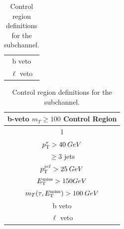 \begin{table}[!thp]
\begin{subtable}[c]{.45\textwidth}
\begin{tabular}{| c |}
					b veto \\
					$\ell$ veto \\
					\hline
				\end{tabular}
			\end{subtable}
			\begin{subtable}[c]{.45\textwidth}
				\centering
				\begin{tabular}{| c |}
					\hline
					\textbf{b-veto $m_{T}\geq100$ Control Region} \\ \hline \hline
					1 \tauhad \\
					$p_{\text{T}}^{\tau} > 40 \: GeV $  \\
					$\geq 3$ jets \\
					$p_{\text{T}}^{jet} > 25 \: GeV$ \\
					$E_\text{T}^\text{miss} > 150 GeV$ \\
					$m_{T}(\tau, E_\text{T}^\text{miss}) > 100 \: GeV$ \\
					b veto \\
					$\ell$ veto \\
					\hline
				\end{tabular}
			\end{subtable}

			\caption{Control region definitions for the \taujets subchannel.}
			\label{tab:taujet-control-regions}
		\end{table}

